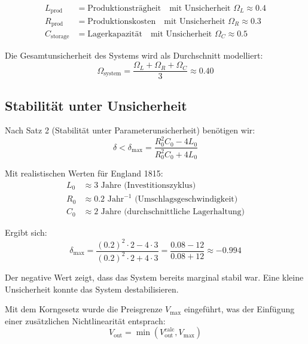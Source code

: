 \documentclass[a4paper, 12pt, twoside, openright]{report}
\theoremstyle{definition}
\theoremstyle{definition}
\begin{document}
\begin{align}
L_{\text{prod}} &= \text{Produktionsträgheit} \quad \text{mit Unsicherheit } \Omega_L \approx 0.4\\
R_{\text{prod}} &= \text{Produktionskosten} \quad \text{mit Unsicherheit } \Omega_R \approx 0.3 \\
C_{\text{storage}} &= \text{Lagerkapazität} \quad \text{mit Unsicherheit } \Omega_C \approx 0.5
\end{align}

Die Gesamtunsicherheit des Systems wird als Durchschnitt modelliert:
\begin{equation}
\Omega_{\text{system}} = \frac{\Omega_L + \Omega_R + \Omega_C}{3} \approx 0.40
\end{equation}

\subsection{Stabilität unter Unsicherheit}

Nach Satz 2 (Stabilität unter Parameterunsicherheit) benötigen wir:
\begin{equation}
\delta < \delta_{\max} = \frac{R_0^2 C_0 - 4L_0}{R_0^2 C_0 + 4L_0}
\end{equation}

Mit realistischen Werten für England 1815:
\begin{align}
L_0 &\approx 3 \text{ Jahre (Investitionszyklus)} \\
R_0 &\approx 0.2 \text{ Jahr}^{-1} \text{ (Umschlagsgeschwindigkeit)} \\
C_0 &\approx 2 \text{ Jahre (durchschnittliche Lagerhaltung)}
\end{align}

Ergibt sich:
\begin{equation}
\delta_{\max} = \frac{(0.2)^2 \cdot 2 - 4 \cdot 3}{(0.2)^2 \cdot 2 + 4 \cdot 3} = \frac{0.08 - 12}{0.08 + 12} \approx -0.994
\end{equation}

Der negative Wert zeigt, dass das System bereits marginal stabil war. Eine kleine Unsicherheit konnte das System destabilisieren.

Mit dem Korngesetz wurde die Preisgrenze $V_{\max}$ eingeführt, was der Einfügung einer zusätzlichen Nichtlinearität entsprach:
\begin{equation}
V_{\text{out}} = \min(V_{\text{out}}^{\text{calc}}, V_{\max})
\end{equation}
\end{document}
